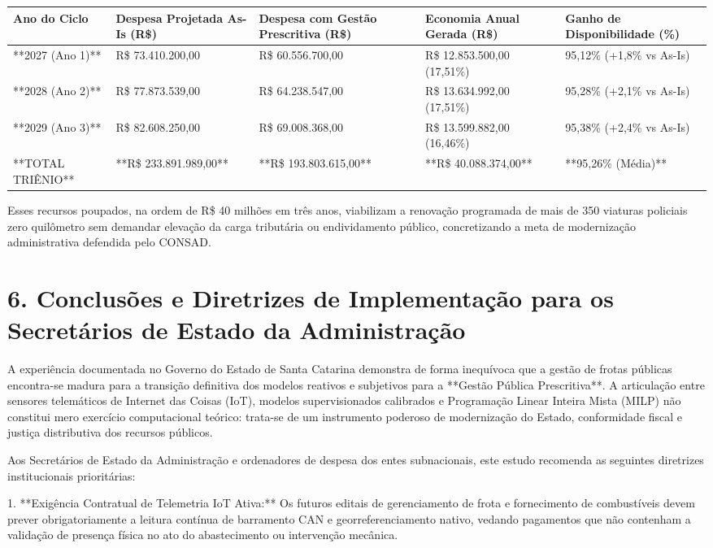 \documentclass[10pt,a4paper,journal]{article}
\begin{document}
\begin{table}[htbp]
\centering
\small
\begin{tabular}{lllll}
\toprule
Ano do Ciclo & Despesa Projetada As-Is (R\$) & Despesa com Gestão Prescritiva (R\$) & Economia Anual Gerada (R\$) & Ganho de Disponibilidade (\%) \\
\midrule
**2027 (Ano 1)** & R\$ 73.410.200,00 & R\$ 60.556.700,00 & R\$ 12.853.500,00 (17,51\%) & 95,12\% (+1,8\% vs As-Is) \\
**2028 (Ano 2)** & R\$ 77.873.539,00 & R\$ 64.238.547,00 & R\$ 13.634.992,00 (17,51\%) & 95,28\% (+2,1\% vs As-Is) \\
**2029 (Ano 3)** & R\$ 82.608.250,00 & R\$ 69.008.368,00 & R\$ 13.599.882,00 (16,46\%) & 95,38\% (+2,4\% vs As-Is) \\
**TOTAL TRIÊNIO** & **R\$ 233.891.989,00** & **R\$ 193.803.615,00** & **R\$ 40.088.374,00** & **95,26\% (Média)** \\
\bottomrule
\end{tabular}
\end{table}
Esses recursos poupados, na ordem de R\$ 40 milhões em três anos, viabilizam a renovação programada de mais de 350 viaturas policiais zero quilômetro sem demandar elevação da carga tributária ou endividamento público, concretizando a meta de modernização administrativa defendida pelo CONSAD.

\section{6. Conclusões e Diretrizes de Implementação para os Secretários de Estado da Administração}
A experiência documentada no Governo do Estado de Santa Catarina demonstra de forma inequívoca que a gestão de frotas públicas encontra-se madura para a transição definitiva dos modelos reativos e subjetivos para a **Gestão Pública Prescritiva**. A articulação entre sensores telemáticos de Internet das Coisas (IoT), modelos supervisionados calibrados e Programação Linear Inteira Mista (MILP) não constitui mero exercício computacional teórico: trata-se de um instrumento poderoso de modernização do Estado, conformidade fiscal e justiça distributiva dos recursos públicos.

Aos Secretários de Estado da Administração e ordenadores de despesa dos entes subnacionais, este estudo recomenda as seguintes diretrizes institucionais prioritárias:

1. **Exigência Contratual de Telemetria IoT Ativa:** Os futuros editais de gerenciamento de frota e fornecimento de combustíveis devem prever obrigatoriamente a leitura contínua de barramento CAN e georreferenciamento nativo, vedando pagamentos que não contenham a validação de presença física no ato do abastecimento ou intervenção mecânica.
\end{document}
